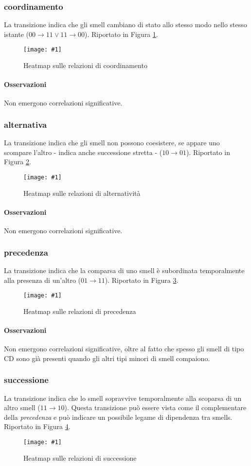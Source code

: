 \documentclass[a4paper,11pt,oneside, table]{article}
\newcommand{\putimage}[4] {
  \begin{figure}[H]
    \centering
    \texttt{[image: \#1]}
    \caption{#2}\label{#3}
  \end{figure}
}
\begin{document}
  \subsubsection{coordinamento}
  La transizione indica che gli smell cambiano di stato allo stesso modo nello stesso istante ($00 \rightarrow 11 \lor 11 \rightarrow 00$). Riportato in Figura \ref{png:dependencies-coordination}.
  \putimage{images/dependencies-coordination.png}{Heatmap sulle relazioni di coordinamento}{png:dependencies-coordination}{0.5}

  \paragraph{Osservazioni}
  Non emergono correlazioni significative.
  
  \subsubsection{alternativa}
  La transizione indica che gli smell non possono coesistere, se appare uno scompare l'altro - indica anche successione stretta - ($10 \rightarrow 01$). Riportato in Figura \ref{png:dependencies-alternate}.
  \putimage{images/dependencies-alternate.png}{Heatmap sulle relazioni di alternativit\`a}{png:dependencies-alternate}{0.5}

  \paragraph{Osservazioni}
  Non emergono correlazioni significative.
  
  \subsubsection{precedenza}
  La transizione indica che la comparsa di uno smell \`e subordinata temporalmente alla presenza di un'altro ($01 \rightarrow 11$). Riportato in Figura \ref{png:dependencies-precedence}.
  \putimage{images/dependencies-precedence.png}{Heatmap sulle relazioni di precedenza}{png:dependencies-precedence}{0.5}

  \paragraph{Osservazioni}
  Non emergono correlazioni significative, oltre al fatto che spesso gli smell di tipo CD sono gi\`a presenti quando gli altri tipi minori di smell compaiono.
  
  \subsubsection{successione}
  La transizione indica che lo smell sopravvive temporalmente alla scoparsa di un altro smell ($11 \rightarrow 10$). Questa transizione pu\`o essere vista come il complementare della \textit{precedenza} e pu\`o indicare un possibile legame di dipendenza tra smells. Riportato in Figura \ref{png:dependencies-succession}.
  \putimage{images/dependencies-succession.png}{Heatmap sulle relazioni di successione}{png:dependencies-succession}{0.5}
\end{document}
